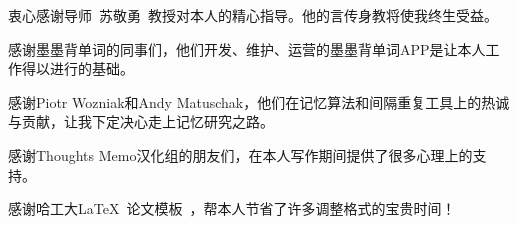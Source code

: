 \begin{acknowledgements}
衷心感谢导师~苏敬勇~教授对本人的精心指导。他的言传身教将使我终生受益。

感谢墨墨背单词的同事们，他们开发、维护、运营的墨墨背单词APP是让本人工作得以进行的基础。

感谢Piotr Wozniak和Andy Matuschak，他们在记忆算法和间隔重复工具上的热诚与贡献，让我下定决心走上记忆研究之路。

感谢Thoughts Memo汉化组的朋友们，在本人写作期间提供了很多心理上的支持。

感谢哈工大\LaTeX\ 论文模板\hithesis\ ，帮本人节省了许多调整格式的宝贵时间！

\end{acknowledgements}
